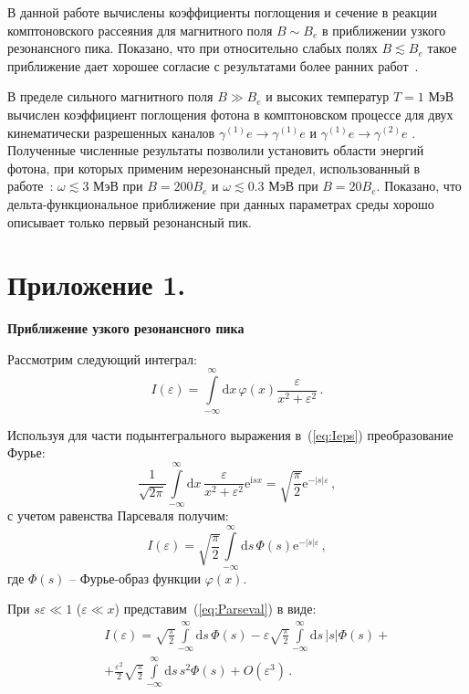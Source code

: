 \documentclass[cp1251%
               ]{jetp} %
\newcommand{\ii}{\mathrm{i}} %
\newcommand{\dd}{\mathrm{d}} %
\newcommand{\eee}{\mathrm{e}} %
\begin{document}
В данной работе вычислены коэффициенты поглощения и сечение в реакции комптоновского рассеяния для магнитного поля $B\sim B_e$ в приближении узкого резонансного пика. Показано, что при относительно слабых полях $B\lesssim B_e$ такое приближение дает хорошее согласие с результатами более ранних работ~\cite{Harding:1991,Mushtukov:2015,SchwarmD:2017}.

В пределе сильного магнитного поля $B\gg B_e$ и высоких температур $T=1$ МэВ вычислен коэффициент поглощения фотона в комптоновском процессе для двух кинематически разрешенных каналов $\gamma^{(1)} e\to \gamma^{(1)} e$ и $\gamma^{(1)} e\to \gamma^{(2)} e$ . Полученные численные результаты позволили установить области энергий фотона, при которых применим нерезонансный предел, использованный в работе~\cite{Chistyakov:2009}: $\omega\lesssim 3$ МэВ при $B=200B_e$ и $\omega\lesssim 0.3$ МэВ при $B=20B_e$. Показано, что дельта-функциональное приближение при данных параметрах среды хорошо описывает только первый резонансный пик.


\section*{Приложение 1.}

\begin{center}
	\textbf{Приближение узкого резонансного пика}
\end{center}
	
Рассмотрим следующий интеграл:
\begin{equation}\label{eq:Ieps}
	I(\varepsilon)=\int\limits_{-\infty}^\infty 
	\dd x\, \varphi(x)\frac{\varepsilon}{x^2+\varepsilon^2} \,	 .
\end{equation}
	
Используя для части подынтегрального выражения в~(\ref{eq:Ieps}) преобразование 
Фурье: 
\begin{equation}
	\frac{1}{\sqrt{2\pi}}\int\limits_{-\infty}^{\infty}\dd x
	\,\frac{\varepsilon}{x^2+\varepsilon^2}
	 \eee^{\ii s x} =\sqrt{\frac{\pi}{2}} \eee^{-|s| \varepsilon}\, ,
\end{equation}
с учетом равенства Парсеваля получим:
\begin{equation}\label{eq:Parseval}
	I(\varepsilon) = 
	\sqrt{\frac{\pi}{2}}\int\limits_{-\infty}^{\infty}\dd s\, 
	\Phi(s) \eee^{-|s|\varepsilon} 
	 \, ,
\end{equation}	
где $\Phi(s)$ -- Фурье-образ функции $\varphi(x)$.

При $s\varepsilon\ll1$ ($\varepsilon \ll x$) представим~(\ref{eq:Parseval}) в 
виде:
\begin{eqnarray}
	&&
	I(\varepsilon) = \sqrt{\frac{\pi}{2}}\int\limits_{-\infty}^{\infty} \dd s\, 
	\Phi(s) 
	-
	\varepsilon\sqrt{\frac{\pi}{2}}\int\limits_{-\infty}^{\infty}\dd s\, 
	|s|\Phi(s) +
	\\&&+
	\nonumber 
	\frac{\varepsilon^2}{2}\sqrt{\frac{\pi}{2}}\int\limits_{-\infty}^{\infty}\dd
	 s\, 
	s^2\Phi(s)  + O(\varepsilon^3)\, .
\end{eqnarray}
\end{document}
